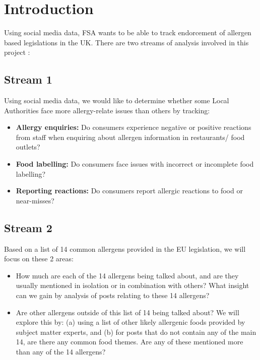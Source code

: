 \section{Introduction}
\label{sec:Intro}

Using social media data, FSA wants to be able to track endorcement of allergen based legislations in the UK.
There are two streams of analysis involved in this project :

\subsection{Stream 1}
\label{subsec:stream1}
Using social media data, we would like to determine whether some Local Authorities face more allergy-relate issues than others by tracking:

\begin{itemize}
  \item {\bf Allergy enquiries:} Do consumers experience negative or positive reactions from staff when enquiring about allergen information in restaurants/ food outlets?
  \item {\bf Food labelling:} Do consumers face issues with incorrect or incomplete food labelling?
  \item {\bf Reporting reactions:} Do consumers report allergic reactions to food or near-misses?
\end{itemize}

\subsection{Stream 2}
\label{subsec:stream2}
Based on a list of 14 common allergens provided in the EU legislation, we will focus on these 2 areas:

\begin{itemize}
  \item How much are each of the 14 allergens being talked about, and are they usually mentioned in isolation or in combination with others? What insight can we gain by analysis of posts relating to these 14 allergens?
  \item Are other allergens outside of this list of 14 being talked about? We will explore this by: (a) using a list of other likely allergenic foods provided by subject matter experts, and (b) for posts that do not contain any of the main 14, are there any common food themes. Are any of these mentioned more than any of the 14 allergens?
\end{itemize}
